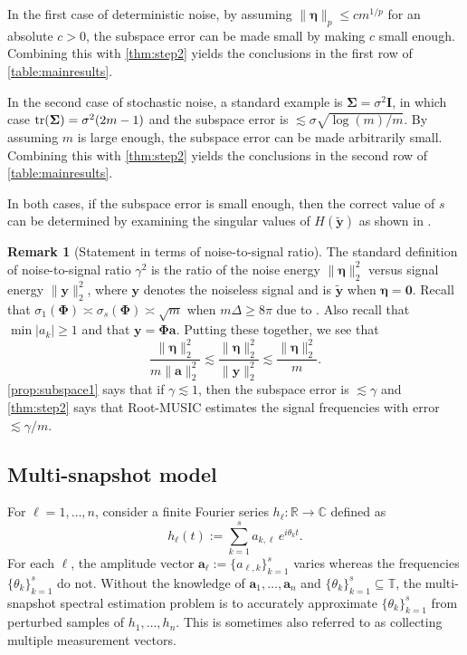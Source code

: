 \documentclass[11pt]{article}
\theoremstyle{definition}
\newtheorem{remark}[theorem]{Remark}
\numberwithin{theorem}{section}
\numberwithin{equation}{section}
\def\C{\mathbb{C}}
\def\R{\mathbb{R}}
\def\T{\mathbb{T}}
\renewcommand{\subset}{\subseteq}
\renewcommand{\tilde}{\widetilde}
\def\tr{{\rm tr}}
\newcommand{\bfa}{{\boldsymbol a}}
\newcommand{\bfy}{{\boldsymbol y}}
\newcommand{\bfI}{{\boldsymbol I}}
\newcommand{\bfzero}{{\boldsymbol 0}}
\newcommand{\bfeta}{{\boldsymbol \eta}}
\newcommand{\bfPhi}{{\boldsymbol \Phi}}
\newcommand{\bfSigma}{{\boldsymbol \Sigma}}
\numberwithin{equation}{section}
\begin{document}
In the first case of deterministic noise, by assuming $\|\bfeta\|_p \leq c m^{1/p}$ for an absolute $c>0$, the subspace error can be made small by making $c$ small enough. Combining this with \cref{thm:step2} yields the conclusions in the first row of \cref{table:mainresults}. 

In the second case of stochastic noise, a standard example is $\bfSigma=\sigma^2 \bfI$, in which case $\tr(\bfSigma)=\sigma^2 (2m-1)$ and the subspace error is $\lesssim \sigma \sqrt{\log(m)/m}$. By assuming $m$ is large enough, the subspace error can be made arbitrarily small. Combining this with \cref{thm:step2} yields the conclusions in the second row of \cref{table:mainresults}. 

In both cases, if the subspace error is small enough, then the correct value of $s$ can be determined by examining the singular values of $H(\tilde \bfy)$ as shown in \cite[Lemma 5.6]{fannjiang2025optimality}. 

\begin{remark}[Statement in terms of noise-to-signal ratio]
\label{rem:NSR} 
    The standard definition of noise-to-signal ratio 
    $\gamma^2$ is the ratio of the noise energy $\|\bfeta\|_2^2$ versus signal energy $\|\bfy\|_2^2$, where $\bfy$ denotes the noiseless signal and is $\tilde \bfy$ when $\bfeta=\bfzero$. Recall that $\sigma_1(\bfPhi)\asymp \sigma_s(\bfPhi)\asymp\sqrt m$ when $m\Delta \geq 8\pi$ due to \cite{aubel2019vandermonde}. Also recall that $\min |a_k|\geq 1$ and that $\bfy=\bfPhi \bfa$. Putting these together, we see that
    $$
    \frac{\|\bfeta\|_2^2}{m \|\bfa\|_2^2}
    \lesssim \frac{\|\bfeta\|_2^2}{\|\bfy\|_2^2}
    \lesssim \frac{\|\bfeta\|_2^2}{m}.
    $$
    \cref{prop:subspace1} says that if $\gamma\lesssim 1$, then the subspace error is $\lesssim \gamma$ and \cref{thm:step2} says that Root-MUSIC estimates the signal frequencies with error $\lesssim \gamma/m$.
\end{remark}

\subsection{Multi-snapshot model}
\label{sec:subspace2}

For $\ell=1,\dots,n$, consider a finite Fourier series $h_\ell\colon\R \to\C$ defined as
\begin{equation}
	\label{eq:hdef2}
	h_\ell(t):= \sum_{k=1}^s a_{k,\ell} \, e^{i\theta_k t}. 
\end{equation}
For each $\ell$, the amplitude vector $\bfa_\ell:=\{ a_{\ell,k}\}_{k=1}^s$ varies whereas the frequencies $\{\theta_k\}_{k=1}^s$ do not. Without the knowledge of  $\bfa_1,\dots,\bfa_n$ and $\{\theta_k\}_{k=1}^s\subset \T$, the multi-snapshot spectral estimation problem is to accurately approximate $\{\theta_k\}_{k=1}^s$ from perturbed samples of $h_1,\dots,h_n$. This is sometimes also referred to as collecting multiple measurement vectors. 
\end{document}
